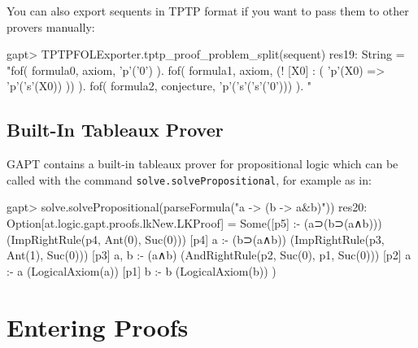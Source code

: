 \documentclass[a4paper,11pt]{article}
\begin{document}
You can also export sequents in TPTP format if you want to pass them to other
provers manually:
\begin{clilisting}
gapt> TPTPFOLExporter.tptp_proof_problem_split(sequent)
res19: String =
"fof( formula0, axiom, 'p'('0') ).
fof( formula1, axiom, (! [X0] : ( 'p'(X0) => 'p'('s'(X0)) )) ).
fof( formula2, conjecture, 'p'('s'('s'('0'))) ).
"

\end{clilisting}

\subsection{Built-In Tableaux Prover}

GAPT contains a  built-in tableaux prover for propositional logic
which can be called with the command \texttt{solve.solvePropositional}, for example as in:
\begin{clilisting}
gapt> solve.solvePropositional(parseFormula("a -> (b -> a&b)"))
res20: Option[at.logic.gapt.proofs.lkNew.LKProof] =
Some([p5]  :- (a⊃(b⊃(a∧b)))    (ImpRightRule(p4, Ant(0), Suc(0)))
[p4] a :- (b⊃(a∧b))    (ImpRightRule(p3, Ant(1), Suc(0)))
[p3] a, b :- (a∧b)    (AndRightRule(p2, Suc(0), p1, Suc(0)))
[p2] a :- a    (LogicalAxiom(a))
[p1] b :- b    (LogicalAxiom(b))
)

\end{clilisting}

\section{Entering Proofs}\label{sec:entering_proofs}
\end{document}
